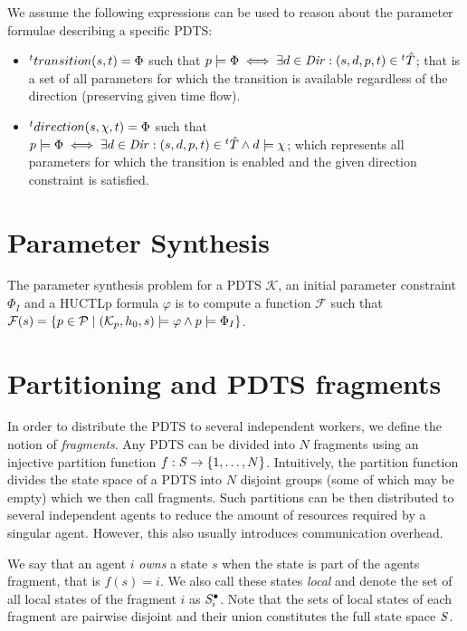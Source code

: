 We assume the following expressions can be used to reason about the parameter formulae describing a specific \ac{PDTS}:

\begin{itemize}
	\item ${}^{t}transition(s,t) = \Phi$ such that $p \models \Phi \iff \exists d \in \mathit{Dir} : (s, d, p, t) \in {}^{t}\hat{T}$; that is a set of all parameters for which the transition is available regardless of the direction (preserving given time flow).
	\item ${}^{t}direction(s, \chi ,t) = \Phi$ such that $p \models \Phi \iff \exists d \in \mathit{Dir} : (s, d, p, t) \in {}^{t}\hat{T} \land d \models \chi$; which represents all parameters for which the transition is enabled and the given direction constraint is satisfied.
\end{itemize}


\section{Parameter Synthesis}

The parameter synthesis problem for a \ac{PDTS} $\mathcal{K}$, an initial parameter constraint $\Phi_I$ and a \ac{HUCTLp} formula $\varphi$ is to compute a function $\mathcal{F}$ such that $\mathcal{F}(s) = \{p \in \mathcal{P} \mid (\mathcal{K}_p, h_0, s) \models \varphi \land p \models \Phi_I \}$.

\section{Partitioning and \ac{PDTS} fragments}

In order to distribute the \ac{PDTS} to several independent workers, we define the notion of \emph{fragments}. Any \ac{PDTS} can be divided into $N$ fragments using an injective partition function $f: \mathit{S} \to \{1, \ldots, N \}$. Intuitively, the partition function divides the state space of a \ac{PDTS} into $N$ disjoint groups (some of which may be empty) which we then call fragments. Such partitions can be then distributed to several independent agents to reduce the amount of resources required by a singular agent. However, this also usually introduces communication overhead. 

We say that an agent $i$ \emph{owns} a state $s$ when the state is part of the agents fragment, that is $f(s) = i$. We also call these states \emph{local} and denote the set of all local states of the fragment $i$ as $\mathit{S}^\bullet_i$. Note that the sets of local states of each fragment are pairwise disjoint and their union constitutes the full state space $\mathit{S}$. 

